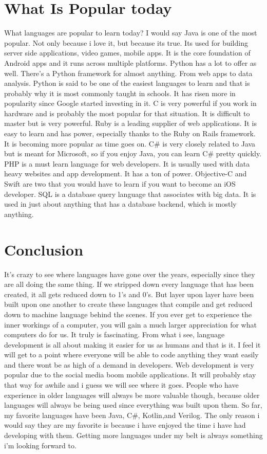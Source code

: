 \documentclass[letterpaper, 10 pt, conference]{IEEEtran}
\begin{document}
\section{What Is Popular today}
\indent What languages are popular to learn today? I would say Java is one of the most popular. Not only because i love it, but because its true. Its used for building server side applications, video games, mobile apps. It is the core foundation of Android apps and it runs across multiple platforms. Python has a lot to offer as well. There's a Python framework for almost anything. From web apps to data analysis. Python is said to be one of the easiest languages to learn and that is probably why it is most commonly taught in schools. It has risen more in popularity since Google started investing in it. C is very powerful if you work in hardware and is probably the most popular for that situation. It is difficult to master but is very powerful. Ruby is a leading supplier of web applications. It is easy to learn and has power, especially thanks to the Ruby on Rails framework. It is becoming more popular as time goes on. C\# is very closely related to Java but is meant for Microsoft, so if you enjoy Java, you can learn C\# pretty quickly. PHP is a must learn language for web developers. It is usually used with data heavy websites and app development. It has a ton of power. Objective-C and Swift are two that you would have to learn if you want to become an iOS developer. SQL is a database query language that associates with big data. It is used in just about anything that has a database backend, which is mostly anything.

\section{Conclusion}
It's crazy to see where languages have gone over the years, especially since they are all doing the same thing. If we stripped down every language that has been created, it all gets reduced down to 1's and 0's. But layer upon layer have been built upon one another to create these languages that compile and get reduced down to machine language behind the scenes. If you ever get to experience the inner workings of a computer, you will gain a much larger appreciation for what computers do for us. It truly is fascinating. From what i see, language development is all about making it easier for us as humans and that is it. I feel it will get to a point where everyone will be able to code anything they want easily and there wont be as high of a demand in developers. Web development is very popular due to the social media boom mobile applications. It will probably stay that way for awhile and i guess we will see where it goes. People who have experience in older languages will always be more valuable though, because older languages will always be being used since everything was built upon them. So far, my favorite languages have been Java, C\#, Kotlin,and Verilog. The only reason i would say they are my favorite is because i have enjoyed the time i have had developing with them. Getting more languages under my belt is always something i'm looking forward to.

\nocite{*}


\end{document}
